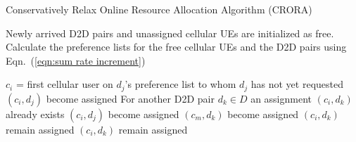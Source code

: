 \documentclass[times]{dacauth}
\begin{document}
\par
 \begin{algorithm}	
   \caption{Conservatively Relax Online Resource Allocation Algorithm (CRORA)}
   \label{algorthm3}
    \begin{algorithmic}[1]

       \State Newly arrived D2D pairs and unassigned cellular UEs are initialized as free.  
        \State Calculate the preference lists for the free cellular UEs and the D2D pairs using Eqn.~(\ref{eqn:sum rate increment})
			
		
			\State $c_i$ = first cellular user on $d_j$'s preference list to whom $d_j$ has not yet requested
				\State $(c_i,d_j)$ become assigned
			\Else
				\State For another D2D pair $d_k \in D$ an assignment $(c_i, d_k)$ already exists
                     	\State $(c_i,d_j)$ become assigned
                     	\State $(c_m,d_k)$ become assigned                     	
					 \Else
						\State $(c_i, d_k)$ remain assigned
						\EndIf						
 	            \Else
					\State $(c_i, d_k)$ remain assigned
					
				\EndIf
			\EndIf
		\EndWhile      	
	\EndProcedure

\end{algorithmic}
\end{algorithm}
\end{document}
